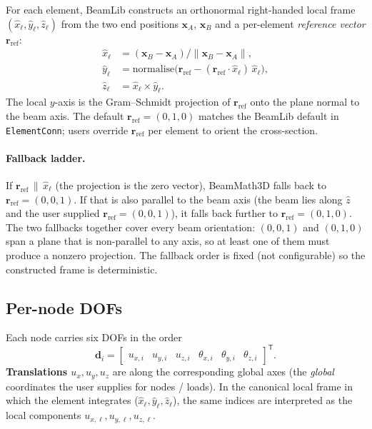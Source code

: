 \documentclass[11pt,a4paper]{article}
\newcommand{\bmath}[1]{\boldsymbol{#1}}
\begin{document}
For each element, BeamLib constructs an orthonormal right-handed local frame $(\hat{x}_\ell, \hat{y}_\ell, \hat{z}_\ell)$ from the two end positions $\bmath{x}_A$, $\bmath{x}_B$ and a per-element \emph{reference vector} $\bmath{r}_{\text{ref}}$:
\begin{align*}
\hat{x}_\ell &= (\bmath{x}_B - \bmath{x}_A) / \|\bmath{x}_B - \bmath{x}_A\|, \\
\hat{y}_\ell &= \mathrm{normalise}\!\bigl(\bmath{r}_{\text{ref}} - (\bmath{r}_{\text{ref}}\!\cdot\!\hat{x}_\ell)\,\hat{x}_\ell\bigr), \\
\hat{z}_\ell &= \hat{x}_\ell \times \hat{y}_\ell.
\end{align*}
The local $y$-axis is the Gram--Schmidt projection of $\bmath{r}_{\text{ref}}$ onto the plane normal to the beam axis. The default $\bmath{r}_{\text{ref}} = (0,1,0)$ matches the BeamLib default in \texttt{ElementConn}; users override $\bmath{r}_{\text{ref}}$ per element to orient the cross-section.

\paragraph{Fallback ladder.} If $\bmath{r}_{\text{ref}}\,\|\,\hat{x}_\ell$ (the projection is the zero vector), BeamMath3D falls back to $\bmath{r}_{\text{ref}} = (0,0,1)$. If that is also parallel to the beam axis (the beam lies along $\hat{z}$ and the user supplied $\bmath{r}_{\text{ref}} = (0,0,1)$), it falls back further to $\bmath{r}_{\text{ref}} = (0,1,0)$. The two fallbacks together cover every beam orientation: $(0,0,1)$ and $(0,1,0)$ span a plane that is non-parallel to any axis, so at least one of them must produce a nonzero projection. The fallback order is fixed (not configurable) so the constructed frame is deterministic.

\subsection{Per-node DOFs}

Each node carries six DOFs in the order
\[
\bmath{d}_i = \begin{bmatrix} u_{x,i} & u_{y,i} & u_{z,i} & \theta_{x,i} & \theta_{y,i} & \theta_{z,i} \end{bmatrix}^\mathsf{T}.
\]
\textbf{Translations $u_x, u_y, u_z$} are along the corresponding global axes (the \emph{global} coordinates the user supplies for nodes / loads). In the canonical local frame in which the element integrates ($\hat{x}_\ell, \hat{y}_\ell, \hat{z}_\ell$), the same indices are interpreted as the local components $u_{x,\ell}, u_{y,\ell}, u_{z,\ell}$.
\end{document}
